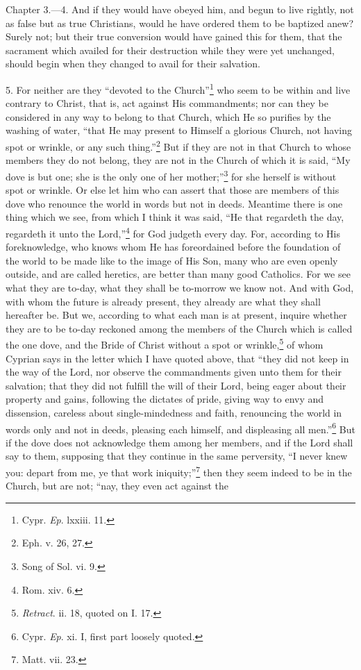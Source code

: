 
Chapter 3.—4. And if they would have obeyed him, and begun to live rightly, not as false but as true Christians, would he have ordered them to be baptized anew? Surely not; but their true conversion would have gained this for them, that the sacrament which availed for their destruction while they were yet unchanged, should begin when they changed to avail for their salvation.

5. For neither are they ``devoted to the Church''\footnote{\par  Cypr. \emph{Ep}. lxxiii. 11.} who seem to be within and live contrary to Christ, that is, act against His commandments; nor can they be considered in any way to belong to that Church, which He so purifies by the washing of water, ``that He may present to Himself a glorious Church, not having spot or wrinkle, or any such thing.''\footnote{\par  Eph. v. 26, 27.} But if they are not in that Church to whose members they do not belong, they are not in the Church of which it is said, ``My dove is but one; she is the only one of her mother;''\footnote{\par  Song of Sol. vi. 9.} for she herself is without spot or wrinkle. Or else let him who can assert that those are members of this dove who renounce the world in words but not in deeds. Meantime there is one thing which we see, from which I think it was said, ``He that regardeth the day, regardeth it unto the Lord,''\footnote{\par  Rom. xiv. 6.} for God judgeth every day. For, according to His foreknowledge, who knows whom He has foreordained before the foundation of the world to be made like to the image of His Son, many who are even openly outside, and are called heretics, are better than many good Catholics. For we see what they are to-day, what they shall be to-morrow we know not. And with God, with whom the future is already present, they already are what they shall hereafter be. But we, according to what each man is at present, inquire whether they are to be to-day reckoned among the members of the Church which is called the one dove, and the Bride of Christ without a spot or wrinkle,\footnote{\par  \emph{Retract}. ii. 18, quoted on I. 17.} of whom Cyprian says in the letter which I have quoted above, that ``they did not keep in the way of the Lord, nor observe the commandments given unto them for their salvation; that they did not fulfill the will of their Lord, being eager about their property and gains, following the dictates of pride, giving way to envy and dissension, careless about single-mindedness and faith, renouncing the world in words only and not in deeds, pleasing each himself, and displeasing all men.''\footnote{\par  Cypr. \emph{Ep}. xi. I, first part loosely quoted.} But if the dove does not acknowledge them among her members, and if the Lord shall say to them, supposing that they continue in the same perversity, ``I never knew you: depart from me, ye that work iniquity;''\footnote{\par  Matt. vii. 23.} then they seem indeed to be in the Church, but are not; ``nay, they even act against the 